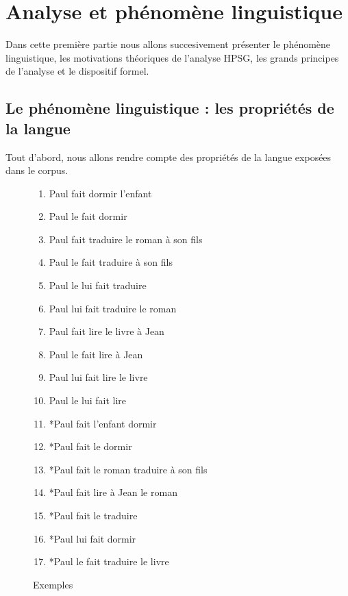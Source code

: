%

\section {Analyse et phénomène linguistique}

Dans cette première partie nous allons succesivement présenter le phénomène linguistique, les motivations théoriques de l'analyse HPSG, les grands principes de l'analyse et le dispositif formel.

\subsection{Le phénomène linguistique : les propriétés de la langue}

Tout d'abord, nous allons rendre compte des propriétés de la langue exposées dans le corpus.\\

\begin{figure}[ht]
\centering
\begin{minipage}{.5\textwidth}
\begin{enumerate}
  \item Paul fait dormir l'enfant
  \item Paul le fait dormir
  \item Paul fait traduire le roman à son fils
  \item Paul le fait traduire à son fils
  \item Paul le lui fait traduire
  \item Paul lui fait traduire le roman
  \item Paul fait lire le livre à Jean
  \item Paul le fait lire à Jean
  \item Paul lui fait lire le livre
  \item Paul le lui fait lire
  \item *Paul fait l'enfant dormir
  \item *Paul fait le dormir
  \item *Paul fait le roman traduire à son fils
  \item *Paul fait lire à Jean le roman
  \item *Paul fait le traduire
  \item *Paul lui fait dormir
  \item *Paul le fait traduire le livre
\end{enumerate}
\caption{Exemples \label{phenomene.exemples}}
\end{minipage}
\end{figure}

